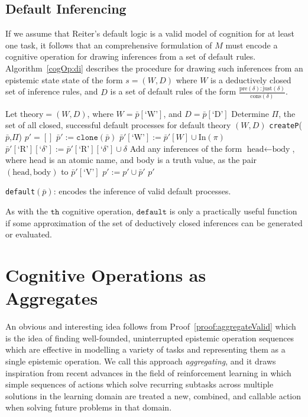 \subsection{Default Inferencing}
If we assume that Reiter's default logic is a valid model of cognition for at least one task, it follows that an comprehensive formulation of $M$ must encode a cognitive operation for drawing inferences from a set of default rules. Algorithm~\ref{cogOp:di} describes the procedure for drawing such inferences from an epistemic state state of the form $s=(W,D)$ where $W$ is a deductively closed set of inference rules, and $D$ is a set of default rules of the form $\frac{\text{pre}(\delta):\text{just}(\delta)}{\text{cons}(\delta)}$.

\begin{algorithm}[H] 
\SetAlgoLined
{}
{
Let $\textrm{theory}=(W,D)$, where $W=\bar{p}[\text{`W'}]$, and $D=\bar{p}[\textrm{`D'}]$\;
Determine $\Pi$, the set of all closed, successful default processes for default theory $(W,D)$\;
\Return \texttt{createP}($\bar{p}$,$\Pi$)
}
{
$p'=[]$
\For{$\pi \in \Pi$}
{
$\bar{p}':=\texttt{clone}(\bar{p})$\;
$\bar{p}'[\textrm{`W'}]:=\bar{p}'[W]\cup \text{In}(\pi)$\;
$\bar{p}'[\textrm{`R'}][\textrm{`}\delta\textrm{'}]:=\bar{p}'[\textrm{`R'}][\textrm{`}\delta\textrm{'}]\cup \delta$\;
Add any inferences of the form $\text{head}\leftarrow \text{body}$, where head is an atomic name, and body is a truth value, as the pair $(\text{head},\text{body})$ to $\bar{p}'[\textrm{`V'}]$\;
$p':=p'\cup \bar{p}'$\;
\Return $p'$
}
}

\caption{\texttt{default}$(\bar{p})$: encodes the inference of valid default processes.}
\label{cogOp:di}
\end{algorithm}

As with the $\texttt{th}$ cognitive operation, $\texttt{default}$ is only a practically useful function if some approximation of the set of deductively closed inferences can be generated or evaluated.

\section{Cognitive Operations as Aggregates}
An obvious and interesting idea follows from Proof~\ref{proof:aggregateValid} which is the idea of finding well-founded, uninterrupted epistemic operation sequences which are effective in modelling a variety of tasks and representing them as a single epistemic operation. We call this approach \textit{aggregating}, and it draws inspiration from recent advances in the field of reinforcement learning\citep{drummond2002accelerating} in which simple sequences of actions which solve recurring subtasks across multiple solutions in the learning domain are treated a new, combined, and callable action when solving future problems in that domain.

